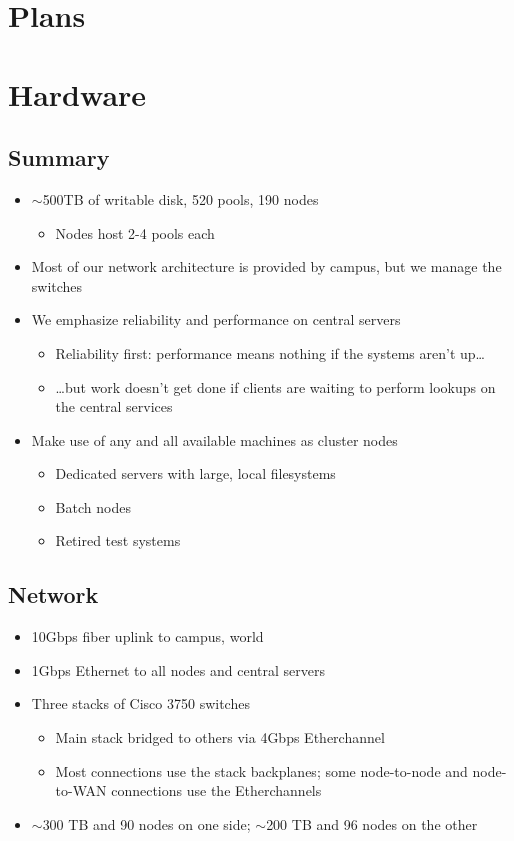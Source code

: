 \documentclass{beamer}
\newcommand{\ca}{\ensuremath{\sim}}
\begin{document}
\section{Plans}

\section{Hardware}
\subsection{Summary}
\begin{frame}
\begin{itemize}
	\item \ca{}500TB of writable disk, 520 pools, 190 nodes
	\begin{itemize}
		\item Nodes host 2-4 pools each
	\end{itemize}
	\item Most of our network architecture is provided by campus, but we manage the switches
	\item We emphasize reliability and performance on central servers
	\begin{itemize}
		\item Reliability first: performance means nothing if the systems aren't up\ldots{}
		\item \ldots{}but work doesn't get done if clients are waiting to perform lookups on the central services
	\end{itemize}
	\item Make use of any and all available machines as cluster nodes
	\begin{itemize}
		\item Dedicated servers with large, local filesystems
		\item Batch nodes
		\item Retired test systems
	\end{itemize}
\end{itemize}
\end{frame}

\subsection{Network}
\begin{frame}
\begin{itemize}
	\item 10Gbps fiber uplink to campus, world
	\item 1Gbps Ethernet to all nodes and central servers
	\item Three stacks of Cisco 3750 switches
	\begin{itemize}
		\item Main stack bridged to others via 4Gbps Etherchannel
		\item Most connections use the stack backplanes; some node-to-node and node-to-WAN connections use the Etherchannels
	\end{itemize}
	\item \ca{}300 TB and 90 nodes on one side; \ca{}200 TB and 96 nodes on the other
\end{itemize}
\end{frame}
\end{document}
